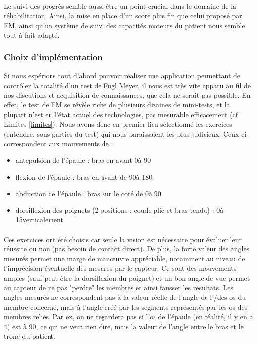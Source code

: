\documentclass[french,12pt]{report}
\begin{document}
\paragraph{}
Le suivi des progrès semble aussi être un point crucial dans le domaine de la réhabilitation. Ainsi, la mise en place d'un score
plus fin que celui proposé par FM, ainsi qu'un système de suivi des capacités moteurs du patient nous semble tout à fait
adapté.

		
		
\subsubsection{Choix d'implémentation}
Si nous espérions tout d'abord pouvoir réaliser une application permettant de contrôler la totalité d'un test de Fugl Meyer, il nous
est très vite apparu au fil de nos discutions et acquisition de connaissances, que cela ne serait pas possible. En effet, le test de FM
se révèle riche de plusieurs dizaines de mini-tests, et la plupart n'est en l'état actuel des technologies, pas mesurable efficacement (cf Limites \ref{limites}). Nous avons donc en premier lieu sélectionné les exercices (entendre, sous parties du test)
qui nous paraissaient les plus judicieux. Ceux-ci correspondent aux mouvements de :
\begin{itemize}
\item antepulsion de l'épaule : bras en avant 0\degre à 90\degre
\item flexion de l'épaule : bras en avant de 90\degre à 180\degre
\item abduction de l'épaule : bras sur le coté de 0\degre à 90\degre
\item dorsiflexion des poignets (2 positions : coude plié et bras tendu) : 0\degre à 15\degre verticalement
\end{itemize}

\paragraph{}
Ces exercices ont été choisis car seule la vision est nécessaire pour évaluer leur réussite ou non (pas besoin de contact direct).
De plus, la forte valeur des angles mesurés permet une marge de manœuvre appréciable, notamment au niveau de l'imprécision
éventuelle des mesures par le capteur. Ce sont des mouvements amples (sauf peut-être la dorsiflexion du poignet) et un bon
angle de vue permet au capteur de ne pas "perdre" les membres et ainsi fausser les résultats. Les angles mesurés ne
correspondent pas à la valeur réelle de l'angle de l'/des os du membre concerné, mais à l'angle créé par les segments représentés par les os des membres reliés. Par ex, on ne regardera pas si l'os de l'épaule (en réalité, il y en a 4) est à 90\degre, ce qui ne veut rien dire, mais la valeur de l'angle entre le bras et le tronc du patient.
\end{document}
